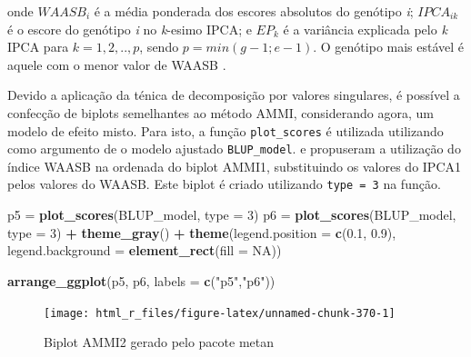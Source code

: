 \documentclass[
]{book}
\newenvironment{Shaded}{\begin{snugshade}}{\end{snugshade}}
\newcommand{\DataTypeTok}[1]{\textcolor[rgb]{0.13,0.29,0.53}{#1}}
\newcommand{\DecValTok}[1]{\textcolor[rgb]{0.00,0.00,0.81}{#1}}
\newcommand{\FloatTok}[1]{\textcolor[rgb]{0.00,0.00,0.81}{#1}}
\newcommand{\KeywordTok}[1]{\textcolor[rgb]{0.13,0.29,0.53}{\textbf{#1}}}
\newcommand{\NormalTok}[1]{#1}
\newcommand{\OperatorTok}[1]{\textcolor[rgb]{0.81,0.36,0.00}{\textbf{#1}}}
\newcommand{\OtherTok}[1]{\textcolor[rgb]{0.56,0.35,0.01}{#1}}
\newcommand{\StringTok}[1]{\textcolor[rgb]{0.31,0.60,0.02}{#1}}
\begin{document}
onde \(WAASB_i\) é a média ponderada dos escores absolutos do genótipo \emph{i}; \(IPCA_{ik}\) é o escore do genótipo \emph{i} no \emph{k}-esimo IPCA; e \(EP_k\) é a variância explicada pelo \emph{k} IPCA para \(k = 1,2, .., p\), sendo \(p = min (g-1; e-1)\). O genótipo mais estável é aquele com o menor valor de WAASB \citep{Olivoto2019}.

Devido a aplicação da ténica de decomposição por valores singulares, é possível a confecção de biplots semelhantes ao método AMMI, considerando agora, um modelo de efeito misto. Para isto, a função \texttt{plot\_scores}  é utilizada utilizando como argumento de o modelo ajustado \texttt{BLUP\_model}. \citet{Olivoto2019} e \citet{Olivoto2019a} propuseram a utilização do índice WAASB na ordenada do biplot AMMI1, substituindo os valores do IPCA1 pelos valores do WAASB. Este biplot é criado utilizando \texttt{type\ =\ 3} na função.

\begin{Shaded}
\begin{Highlighting}[]
\NormalTok{p5 =}\StringTok{ }\KeywordTok{plot_scores}\NormalTok{(BLUP_model, }\DataTypeTok{type =} \DecValTok{3}\NormalTok{)}
\NormalTok{p6 =}\StringTok{ }\KeywordTok{plot_scores}\NormalTok{(BLUP_model, }\DataTypeTok{type =} \DecValTok{3}\NormalTok{) }\OperatorTok{+}
\StringTok{                 }\KeywordTok{theme_gray}\NormalTok{() }\OperatorTok{+}
\StringTok{                 }\KeywordTok{theme}\NormalTok{(}\DataTypeTok{legend.position =} \KeywordTok{c}\NormalTok{(}\FloatTok{0.1}\NormalTok{, }\FloatTok{0.9}\NormalTok{),}
                       \DataTypeTok{legend.background =} \KeywordTok{element_rect}\NormalTok{(}\DataTypeTok{fill =} \OtherTok{NA}\NormalTok{))}

\KeywordTok{arrange_ggplot}\NormalTok{(p5, p6, }\DataTypeTok{labels =} \KeywordTok{c}\NormalTok{(}\StringTok{"p5"}\NormalTok{,}\StringTok{"p6"}\NormalTok{))}
\end{Highlighting}
\end{Shaded}

\begin{figure}

{\centering \texttt{[image: html\_r\_files/figure-latex/unnamed-chunk-370-1]} 

}

\caption{Biplot AMMI2 gerado pelo pacote metan}\label{fig:unnamed-chunk-370}
\end{figure}
\end{document}
